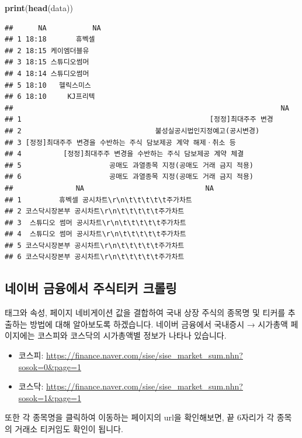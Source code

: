 \documentclass[]{book}
\newenvironment{Shaded}{\begin{snugshade}}{\end{snugshade}}
\newcommand{\KeywordTok}[1]{\textcolor[rgb]{0.13,0.29,0.53}{\textbf{#1}}}
\newcommand{\NormalTok}[1]{#1}
\providecommand{\tightlist}{%
  \setlength{\itemsep}{0pt}\setlength{\parskip}{0pt}}
\begin{document}
\begin{Shaded}
\begin{Highlighting}[]
\KeywordTok{print}\NormalTok{(}\KeywordTok{head}\NormalTok{(data))}
\end{Highlighting}
\end{Shaded}

\begin{verbatim}
##      NA           NA
## 1 18:18       휴벡셀
## 2 18:15 케이엠더블유
## 3 18:15 스튜디오썸머
## 4 18:14 스튜디오썸머
## 5 18:10   헬릭스미스
## 6 18:10     KJ프리텍
##                                                                NA
## 1                                             [정정]최대주주 변경
## 2                                불성실공시법인지정예고(공시변경)
## 3 [정정]최대주주 변경을 수반하는 주식 담보제공 계약 해제ㆍ취소 등
## 4          [정정]최대주주 변경을 수반하는 주식 담보제공 계약 체결
## 5                     공매도 과열종목 지정(공매도 거래 금지 적용)
## 6                     공매도 과열종목 지정(공매도 거래 금지 적용)
##               NA                             NA
## 1         휴벡셀 공시차트\r\n\t\t\t\t\t주가차트
## 2 코스닥시장본부 공시차트\r\n\t\t\t\t\t주가차트
## 3  스튜디오 썸머 공시차트\r\n\t\t\t\t\t주가차트
## 4  스튜디오 썸머 공시차트\r\n\t\t\t\t\t주가차트
## 5 코스닥시장본부 공시차트\r\n\t\t\t\t\t주가차트
## 6 코스닥시장본부 공시차트\r\n\t\t\t\t\t주가차트
\end{verbatim}

\hypertarget{section-16}{%
\subsection{네이버 금융에서 주식티커 크롤링}\label{section-16}}

태그와 속성, 페이지 네비게이션 값을 결합하여 국내 상장 주식의 종목명 및 티커를 추출하는 방법에 대해 알아보도록 하겠습니다. 네이버 금융에서 국내증시 → 시가총액 페이지에는 코스피와 코스닥의 시가총액별 정보가 나타나 있습니다.

\begin{itemize}
\tightlist
\item
  코스피: \url{https://finance.naver.com/sise/sise_market_sum.nhn?sosok=0\&page=1}
\item
  코스닥: \url{https://finance.naver.com/sise/sise_market_sum.nhn?sosok=1\&page=1}
\end{itemize}

또한 각 종목명을 클릭하여 이동하는 페이지의 url을 확인해보면, 끝 6자리가 각 종목의 거래소 티커임도 확인이 됩니다.
\end{document}
